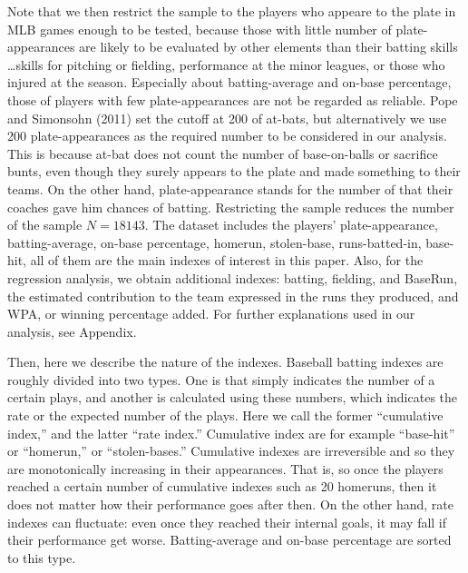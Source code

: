 \documentclass[dvipdfmx, 12pt]{article}
\begin{document}
Note that we then restrict the sample to the players who appeare to the plate in MLB games enough to be tested, because those with little number of plate-appearances are likely to be evaluated by other elements than their batting skills \ldots skills for pitching or fielding, performance at the minor leagues, or those who injured at the season. Especially about batting-average and on-base percentage, those of players with few plate-appearances are not be regarded as reliable. Pope and Simonsohn (2011) set the cutoff at 200 of at-bats, but alternatively we use 200 plate-appearances as the required number to be considered in our analysis. This is because at-bat does not count the number of base-on-balls or sacrifice bunts, even though they surely appears to the plate and made something to their teams. On the other hand, plate-appearance stands for the number of that their coaches gave him chances of batting. Restricting the sample reduces the number of the sample $N=18143$. The dataset includes the players' plate-appearance, batting-average, on-base percentage, homerun, stolen-base, runs-batted-in, base-hit, all of them are the main indexes of interest in this paper. Also, for the regression analysis, we obtain additional indexes: batting, fielding, and BaseRun, the estimated contribution to the team expressed in the runs they produced, and WPA, or winning percentage added. For further explanations used in our analysis, see Appendix.

Then, here we describe the nature of the indexes. Baseball batting indexes are roughly divided into two types. One is that simply indicates the number of a certain plays, and another is calculated using these numbers, which indicates the rate or the expected number of the plays. Here we call the former ``cumulative index,'' and the latter ``rate index.'' Cumulative index are for example ``base-hit'' or ``homerun,'' or ``stolen-bases.'' Cumulative indexes are irreversible and so they are monotonically increasing in their appearances. That is, so once the players reached a certain number of cumulative indexes such as 20 homeruns, then it does not matter how their performance goes after then. On the other hand, rate indexes can fluctuate: even once they reached their internal goals, it may fall if their performance get worse. Batting-average and on-base percentage are sorted to this type.
\end{document}
